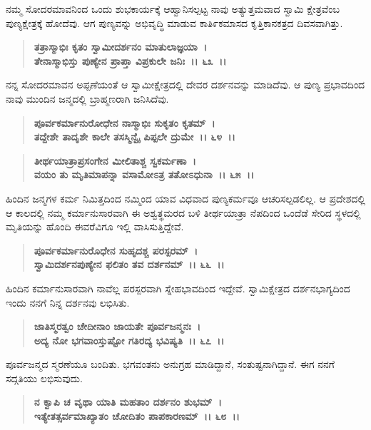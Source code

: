 ನಮ್ಮ ಸೋದರಮಾವನಿಂದ ಒಂದು ಶುಭಕಾರ್ಯಕ್ಕೆ ಆಹ್ವಾನಿಸಲ್ಪಟ್ಟ ನಾವು ಅತ್ಯುತ್ತಮವಾದ ಸ್ವಾಮಿ ಕ್ಷೇತ್ರವೆಂಬ ಪುಣ್ಯಕ್ಷೇತ್ರಕ್ಕೆ ಹೋದೆವು. ಆಗ ಪುಣ್ಯವನ್ನು ಅಭಿವೃದ್ಧಿ ಮಾಡುವ ಕಾತಿ೯ಕಮಾಸದ ಕೃತ್ತಿಕಾನಕತ್ರದ ದಿವಸವಾಗಿತ್ತು.

\begin{verse}
\textbf{ತತ್ರಾಸ್ಮಾಭಿಃ ಕೃತಂ ಸ್ವಾಮೀದರ್ಶನಂ ಮಾತುಲಾಜ್ಞಯಾ~।}\\\textbf{ತೇನಾಸ್ಮಾಭಿಸ್ತು ಪುಣ್ಯೇನ ಪ್ರಾಪ್ತಾ ವಿಪ್ರಕುಲೇ ಜನಿಃ~।। ೬೩~।।}
\end{verse}

ನನ್ನ ಸೋದರಮಾವನ ಅಪ್ಪಣೆಯಂತೆ ಆ ಸ್ವಾಮೀಕ್ಷೇತ್ರದಲ್ಲಿ ದೇವರ ದರ್ಶನವನ್ನು ಮಾಡಿದೆವು. ಆ ಪುಣ್ಯ ಪ್ರಭಾವದಿಂದ ನಾವು ಮುಂದಿನ ಜನ್ಮದಲ್ಲಿ ಬ್ರಾಹ್ಮಣರಾಗಿ ಜನಿಸಿದೆವು.

\begin{verse}
\textbf{ಪೂರ್ವಕರ್ಮಾನುರೋಧೇನ ನಾಸ್ಮಾಭಿಃ ಸುಕೃತಂ ಕೃತಮ್~।}\\\textbf{ತದ್ದೇಶೇ ತಾದೃಶೇ ಕಾಲೇ ತಸಸ್ಮಿನ್ವೈ ಪಿಪ್ಪಲೇ ದ್ರುಮೇ~।। ೬೪~।। }
\end{verse}

\begin{verse}
\textbf{ತೀರ್ಥಯಾತ್ರಾಪ್ರಸಂಗೇನ ಮೀಲಿತಾಶ್ಚ ಸ್ವಕರ್ಮಣಾ~।}\\\textbf{ವಯಂ ತು ಮೃತಿಮಾಪನ್ನಾ ವಸಾಮೋಽತ್ರ ತತೋಽಧುನಾ~।। ೬೫~।।}
\end{verse}

ಹಿಂದಿನ ಜನ್ಮಗಳ ಕರ್ಮ ನಿಮಿತ್ತದಿಂದ ನಮ್ಮಿಂದ ಯಾವ ವಿಧವಾದ ಪುಣ್ಯಕರ್ಮವೂ ಆಚರಿಸಲ್ಪಡಲಿಲ್ಲ. ಆ ಪ್ರದೇಶದಲ್ಲಿ ಆ ಕಾಲದಲ್ಲಿ ನಮ್ಮ ಕರ್ಮಾನುಸಾರವಾಗಿ ಈ ಅಶ್ವತ್ಥಮರದ ಬಳಿ ತೀರ್ಥಯಾತ್ರಾ ನೆಪದಿಂದ ಒಂದೆಡೆ ಸೇರಿದ ಸ್ಥಳದಲ್ಲಿ ಮೃತಿಯನ್ನು ಹೊಂದಿ ಈವರೆವಿಗೂ ಇಲ್ಲಿ ವಾಸಿಸುತ್ತಿದ್ದೇವೆ.

\begin{verse}
\textbf{ಪೂರ್ವಕರ್ಮಾನುರೊಧೇನ ಸುಹೃದಶ್ಚ ಪರಸ್ಪರಮ್~।}\\\textbf{ಸ್ವಾಮಿದರ್ಶನಪುಣ್ಯೇನ ಫಲಿತಂ ತವ ದರ್ಶನಮ್~।। ೬೬~।।}
\end{verse}

ಹಿಂದಿನ ಕರ್ಮಾನುಸಾರವಾಗಿ ನಾವೆಲ್ಲ ಪರಸ್ಪರವಾಗಿ ಸ್ನೇಹಭಾವದಿಂದ ಇದ್ದೇವೆ. ಸ್ವಾಮಿಕ್ಷೇತ್ರದ ದರ್ಶನಭಾಗ್ಯದಿಂದ ಇಂದು ನನಗೆ ನಿನ್ನ ದರ್ಶನವು ಲಭಿಸಿತು.

\begin{verse}
\textbf{ಜಾತಿಸ್ಮರತ್ವಂ ಚೇದೀನಾಂ ಜಾಯತೇ ಪೂರ್ವಜನ್ಮನಃ~।}\\\textbf{ಅದ್ಯ ನೋ ಭಗವಾಂಸ್ತುಷ್ಟೋ ಗತಿರದ್ಯ ಭವಿಷ್ಯತಿ~।। ೬೭~।।}
\end{verse}

ಪೂರ್ವಜನ್ಮದ ಸ್ಮರಣೆಯೂ ಬಂದಿತು. ಭಗವಂತನು ಅನುಗ್ರಹ ಮಾಡಿದ್ದಾನೆ, ಸಂತುಷ್ಟನಾಗಿದ್ದಾನೆ. ಈಗ ನನಗೆ ಸದ್ಗತಿಯು ಲಭಿಸುವುದು.

\begin{verse}
\textbf{ನ ಕ್ವಾಪಿ ಚ ವೃಥಾ ಯಾತಿ ಮಹತಾಂ ದರ್ಶನಂ ಶುಭಮ್~।}\\\textbf{ಇತ್ಯೇತತ್ಸರ್ವಮಾಖ್ಯಾತಂ ಚೋದಿತಂ ಪಾಪಕಾರಣಮ್~।। ೬೮~।।} 
\end{verse}


